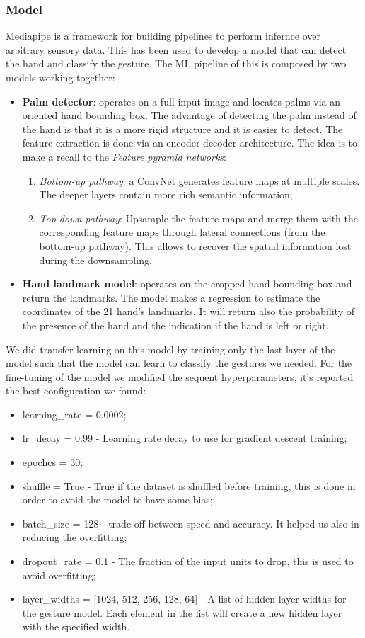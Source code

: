 \documentclass[10pt,twocolumn,letterpaper]{article}
\begin{document}
\subsubsection{Model}
Mediapipe is a framework for building pipelines to perform infernce over arbitrary sensory data. This has been used to develop a model that can detect the hand and classify the gesture.
The ML pipeline of this is composed by two models working together:
\begin{itemize}
   \item \textbf{Palm detector}: operates on a full input image and locates palms via an oriented hand bounding box. The advantage of detecting the palm instead of the hand 
   is that it is a more rigid structure and it is easier to detect. The feature extraction is done via an encoder-decoder architecture. The idea is to make a recall to the 
   \textit{Feature pyramid networks}:
   \begin{enumerate}
      \item \textit{Bottom-up pathway}: a ConvNet generates feature maps at multiple scales. The deeper layers contain more rich semantic information;
      \item \textit{Top-down pathway}: Upsample the feature maps and merge them with the corresponding feature maps through lateral connections (from the bottom-up pathway).
      This allows to recover the spatial information lost during the downsampling.
   \end{enumerate}
   \item \textbf{Hand landmark model}: operates on the cropped hand bounding box and return the landmarks. 
   The model makes a regression to estimate the coordinates of the 21 hand's landmarks. It will return also the probability of the presence of the hand and 
   the indication if the hand is left or right.
\end{itemize}
We did transfer learning on this model by training only the last layer of the model such that the model can learn to classify the gestures we needed.
For the fine-tuning of the model we modified the sequent hyperparameters, it's reported the best configuration we found:
\begin{itemize}
   \item learning\_rate = 0.0002;
   \item lr\_decay = 0.99 - Learning rate decay to use for gradient descent training;
   \item epochcs = 30;
   \item shuffle = True - True if the dataset is shuffled before training, this is done in order to avoid the model to have some bias;
   \item batch\_size = 128 - trade-off between speed and accuracy. It helped us also in reducing the overfitting;
   \item dropout\_rate = 0.1 - The fraction of the input units to drop, this is used to avoid overfitting;
   \item layer\_widths = [1024, 512, 256, 128, 64] - A list of hidden layer widths for the gesture model. Each element in the list will 
   create a new hidden layer with the specified width.
\end{itemize}
\end{document}
